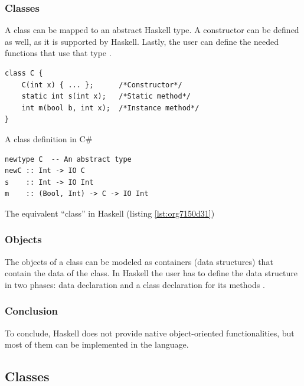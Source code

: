 \documentclass[a4paper, titlepage, twoside]{article}
\begin{document}
\subsubsection{Classes}
\label{sec:org6b13ab7}

A class can be mapped to an abstract Haskell type. A constructor can be defined as well, as it is supported by Haskell. Lastly, the user can define the needed functions that use that type \autocite{frankObjectorientationHaskellExploring2013}.

\begin{listing}[htbp]
\begin{verbatim}
class C {
    C(int x) { ... };      /*Constructor*/
    static int s(int x);   /*Static method*/
    int m(bool b, int x);  /*Instance method*/
}
\end{verbatim}
\caption{\label{lst:org7150d31}A class definition in C\#}
\end{listing}

\begin{listing}[htbp]
\begin{verbatim}
newtype C  -- An abstract type
newC :: Int -> IO C
s    :: Int -> IO Int
m    :: (Bool, Int) -> C -> IO Int
\end{verbatim}
\caption{The equivalent ``class'' in Haskell (listing \ref{lst:org7150d31})}
\end{listing}

\subsubsection{Objects}
\label{sec:orge65a853}

The objects of a class can be modeled as containers (data structures) that contain the data of the class. In Haskell the user has to define the data structure in two phases: data declaration and a class declaration for its methods \autocite{frankObjectorientationHaskellExploring2013}.

\subsubsection{Conclusion}
\label{sec:orga5311a7}

To conclude, Haskell does not provide native object-oriented functionalities, but most of them can be implemented in the language.

\subsection{Classes}
\label{sec:orga4cd881}
\end{document}
